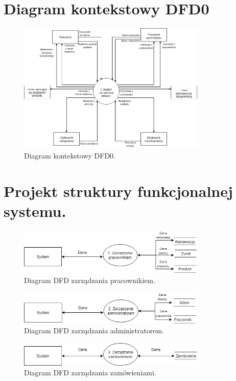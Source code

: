 \documentclass[a4paper,11pt]{article}
\begin{document}
\section {Diagram kontekstowy DFD0}

\begin{figure}[H]
	\centering
		\includegraphics[width=0.8\textwidth]{Diagramy/DFD0.png}
	\caption{Diagram kontekstowy DFD0.}
\end{figure}

\section {Projekt struktury funkcjonalnej systemu.}

\begin{figure}[H]
	\centering
		\includegraphics[width=0.8\textwidth]{Diagramy/DFD0-DFD1.png}
	\caption{Diagram DFD zarządzania pracownikiem.}
\end{figure}

\begin{figure}[H]
	\centering
		\includegraphics[width=0.8\textwidth]{Diagramy/DFD0-DFD2.png}
	\caption{Diagram DFD zarządzania administratorem.}
\end{figure}

\begin{figure}[H]
	\centering
		\includegraphics[width=0.8\textwidth]{Diagramy/DFD0-DFD3.png}
	\caption{Diagram DFD zarządzania zamówieniami.}
\end{figure}
\end{document}

